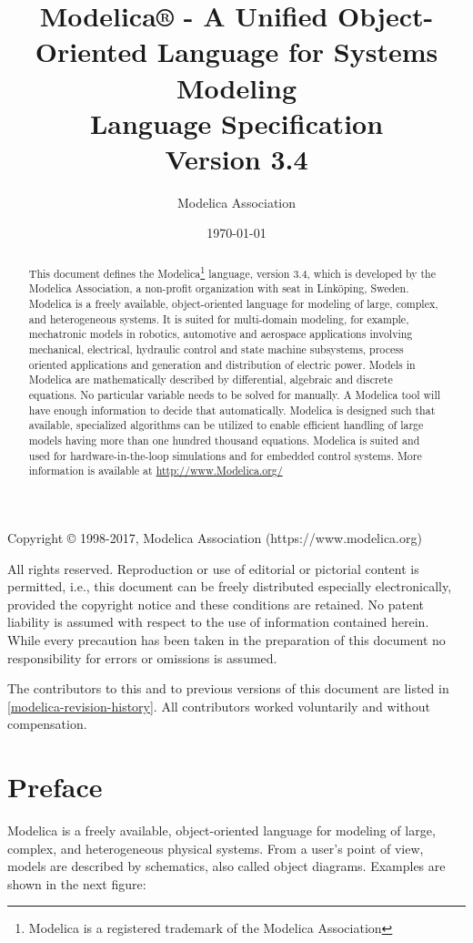 \documentclass[10pt,a4paper]{report}
\title{Modelica® - A Unified Object-Oriented Language for Systems
Modeling\\[2\baselineskip]Language
Specification\\[2\baselineskip]Version 3.4}
\date{\today}
\author{Modelica Association}
\begin{document}
\maketitle
\begin{abstract}
This document defines the Modelica\footnote{Modelica is a registered
  trademark of the Modelica Association} language, version 3.4, which is
developed by the Modelica Association, a non-profit organization with
seat in Linköping, Sweden. Modelica is a freely available,
object-oriented language for modeling of large, complex, and
heterogeneous systems. It is suited for multi-domain modeling, for
example, mechatronic models in robotics, automotive and aerospace
applications involving mechanical, electrical, hydraulic control and
state machine subsystems, process oriented applications and generation
and distribution of electric power. Models in Modelica are
mathematically described by differential, algebraic and discrete
equations. No particular variable needs to be solved for manually. A
Modelica tool will have enough information to decide that automatically.
Modelica is designed such that available, specialized algorithms can be
utilized to enable efficient handling of large models having more than
one hundred thousand equations. Modelica is suited and used for
hardware-in-the-loop simulations and for embedded control systems. More
information is available at
\href{http://www.modelica.org/}{http://www.Modelica.org/}
\end{abstract}
Copyright © 1998-2017, Modelica Association (https://www.modelica.org)

All rights reserved. Reproduction or use of editorial or pictorial
content is permitted, i.e., this document can be freely distributed
especially electronically, provided the copyright notice and these
conditions are retained. No patent liability is assumed with respect to
the use of information contained herein. While every precaution has been
taken in the preparation of this document no responsibility for errors
or omissions is assumed.

The contributors to this and to previous versions of this document are
listed in \ref{modelica-revision-history}. All contributors worked voluntarily and without
compensation.

\tableofcontents

\chapter*{Preface}
Modelica is a freely available, object-oriented language for modeling of
large, complex, and heterogeneous physical systems. From a user's point
of view, models are described by schematics, also called object
diagrams. Examples are shown in the next figure:
\end{document}
